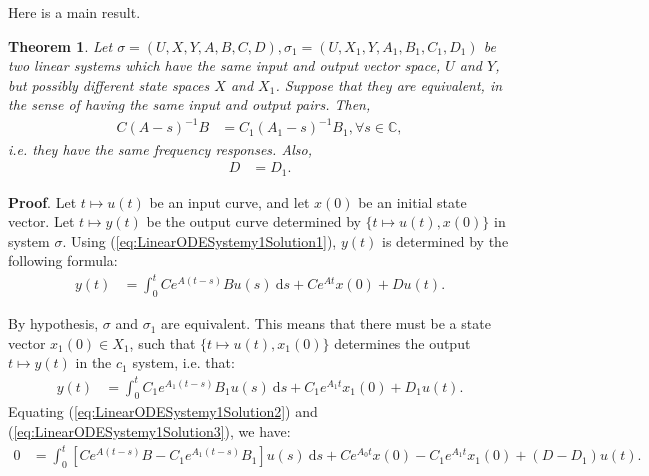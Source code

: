 \documentclass[12pt]{book}
\theoremstyle{plain}
\newtheorem{theorem}{Theorem}[section]
\theoremstyle{definition}
\newcommand{\dd}[1]{\mathrm{d}#1}
\begin{document}
Here is a main result.

\begin{theorem} \label{thm:Equivalence1}
    Let $\sigma = (U, X, Y, A, B, C, D), \sigma_1 = (U, X_1, Y, A_1, B_1, C_1, D_1)$ be two linear systems which have the same input and output vector space, $U$ and $Y$, but possibly different state spaces $X$ and $X_1$.
    Suppose that they are equivalent, in the sense of having the same input and output pairs.
    Then,
    \begin{align}
        C(A-s)^{-1}B &= C_1(A_1-s)^{-1}B_1, \forall s \in \mathbb{C},
    \end{align}
    i.e. they have the same frequency responses.
    Also,
    \begin{align}
        D &= D_1.
    \end{align}
\end{theorem}

\textbf{Proof}. %
Let $t \mapsto u(t)$ be an input curve, and let $x(0)$ be an initial state vector. Let $t \mapsto y(t)$ be the output curve determined by $\{t \mapsto u(t), x(0)\}$ in system $\sigma$. Using (\ref{eq:LinearODESystemy1Solution1}), $y(t)$ is determined by the following formula:
\begin{align} \label{eq:LinearODESystemy1Solution2}
    y(t) &= \int_0^t Ce^{A(t-s)}Bu(s)\ \dd{s} + Ce^{At}x(0) + Du(t).
\end{align}

By hypothesis, $\sigma$ and $\sigma_1$ are equivalent.
This means that there must be a state vector $x_1(0) \in X_1$, such that $\{t \mapsto u(t), x_1(0)\}$ determines the output $t \mapsto y(t)$ in the $c_1$ system, i.e. that:
\begin{align} \label{eq:LinearODESystemy1Solution3}
    y(t) &= \int_0^t C_1e^{A_1(t-s)}B_1u(s)\ \dd{s} + C_1e^{A_1t}x_1(0) + D_1u(t).
\end{align}
Equating (\ref{eq:LinearODESystemy1Solution2}) and (\ref{eq:LinearODESystemy1Solution3}), we have:
\begin{align} \label{eq:LinearODESystemy1Solution4}
    0 &= \int_0^t \left[Ce^{A(t-s)}B-C_1e^{A_1(t-s)}B_1\right]u(s)\ \dd{s} + Ce^{A_0t}x(0) - C_1e^{A_1t}x_1(0) + (D-D_1)u(t).
\end{align}
\end{document}
